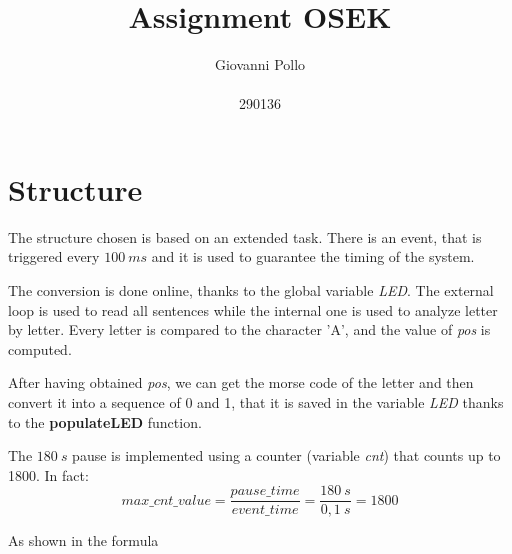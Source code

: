 \documentclass[a4paper]{article}
\title{\Huge Assignment OSEK}
\author{\huge Giovanni Pollo \\ \\ \huge 290136}
\date{}
\begin{document}
\begin{titlepage}
    \centering
    \vspace{2px}
\end{titlepage}
\maketitle

\newpage

\section{Structure}
The structure chosen is based on an extended task. There is an event, that is triggered every \(100\ ms\) and it is used to guarantee the timing of the system.

The conversion is done online, thanks to the global variable \emph{LED}. The external loop is used to read all sentences while the internal one is used to analyze letter by letter. Every letter is compared to the character 'A', and the value of \emph{pos} is computed.

After having obtained \emph{pos}, we can get the morse code of the letter and then convert it into a sequence of 0 and 1, that it is saved in the variable \emph{LED} thanks to the \textbf{populateLED} function.

The \(180\ s\) pause is implemented using a counter (variable \emph{cnt}) that counts up to 1800. In fact:
\begin{equation}
    max\_cnt\_value = \frac{pause\_time}{event\_time} = \frac{180\ s}{0,1\ s} = 1800
\end{equation}

As shown in the formula
\end{document}
